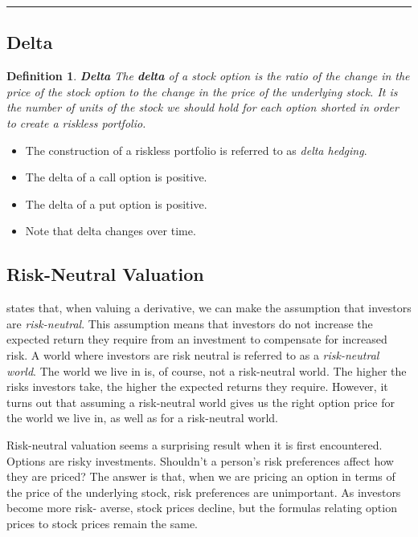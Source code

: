 \documentclass[letterpaper,10pt]{article}
\newtheorem{df}{Definition}[section]
\begin{document}
\bigskip

\hrule

\bigskip

\subsection{Delta}

\begin{df}{\bf Delta}
The {\bf delta} of a stock option is the ratio of the change in the price of the stock option to the change in the price of the underlying stock.  It is the number of units of the stock we should hold for each option shorted in order to create a riskless portfolio.  
\end{df}

\begin{itemize}

\item The construction of a riskless portfolio is referred to as {\em delta hedging}.

\item The delta of a call option is positive.

\item The delta of a put option is positive.

\item Note that delta changes over time.

\end{itemize}

\noindent 

\subsection{Risk-Neutral Valuation}

 states that, when valuing a derivative, we can make the assumption that investors are {\em risk-neutral}.  This assumption means that investors do not increase the expected return they require from an investment to compensate for increased risk.  A world where investors are risk neutral is referred to as a {\em risk-neutral world}. The world we live in is, of course, not a risk-neutral world. The higher the risks investors take, the higher the expected returns they require. However, it turns out that assuming a risk-neutral world gives us the right option price for the world we live in, as well as for a risk-neutral world. 

Risk-neutral valuation seems a surprising result when it is first encountered. Options are risky investments. Shouldn't a person's risk preferences affect how they are priced? The answer is that, when we are pricing an option in terms of the price of the underlying stock, risk preferences are unimportant. As investors become more risk- averse, stock prices decline, but the formulas relating option prices to stock prices remain the same.
\end{document}
